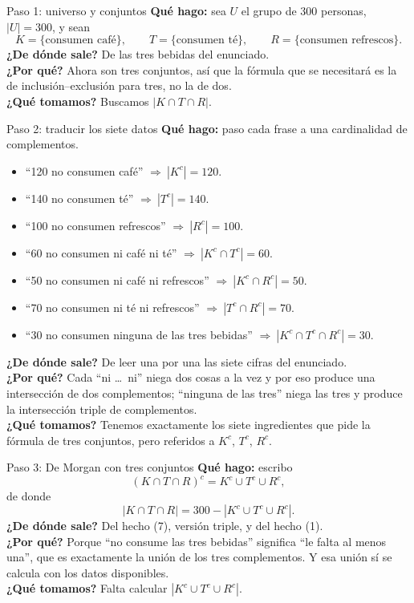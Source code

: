 \documentclass[11pt]{article}
\begin{document}
\begin{sol}

\begin{paso}{Paso 1: universo y conjuntos}
\textbf{Qu\'e hago:} sea $U$ el grupo de $300$ personas, $|U|=300$, y sean
\[
K=\{\text{consumen caf\'e}\},\qquad T=\{\text{consumen t\'e}\},\qquad R=\{\text{consumen refrescos}\}.
\]
\textbf{¿De d\'onde sale?} De las tres bebidas del enunciado.\\
\textbf{¿Por qu\'e?} Ahora son tres conjuntos, as\'i que la f\'ormula que se necesitar\'a es la de inclusi\'on--exclusi\'on para tres, no la de dos.\\
\textbf{¿Qu\'e tomamos?} Buscamos $|K\cap T\cap R|$.
\end{paso}

\begin{paso}{Paso 2: traducir los siete datos}
\textbf{Qu\'e hago:} paso cada frase a una cardinalidad de complementos.
\begin{itemize}[leftmargin=*]
  \item ``120 no consumen caf\'e'' $\Longrightarrow\ |K^{c}| = 120$.
  \item ``140 no consumen t\'e'' $\Longrightarrow\ |T^{c}| = 140$.
  \item ``100 no consumen refrescos'' $\Longrightarrow\ |R^{c}| = 100$.
  \item ``60 no consumen ni caf\'e ni t\'e'' $\Longrightarrow\ |K^{c}\cap T^{c}| = 60$.
  \item ``50 no consumen ni caf\'e ni refrescos'' $\Longrightarrow\ |K^{c}\cap R^{c}| = 50$.
  \item ``70 no consumen ni t\'e ni refrescos'' $\Longrightarrow\ |T^{c}\cap R^{c}| = 70$.
  \item ``30 no consumen ninguna de las tres bebidas'' $\Longrightarrow\ |K^{c}\cap T^{c}\cap R^{c}| = 30$.
\end{itemize}
\textbf{¿De d\'onde sale?} De leer una por una las siete cifras del enunciado.\\
\textbf{¿Por qu\'e?} Cada ``ni \dots\ ni'' niega dos cosas a la vez y por eso produce una intersecci\'on de dos complementos; ``ninguna de las tres'' niega las tres y produce la intersecci\'on triple de complementos.\\
\textbf{¿Qu\'e tomamos?} Tenemos exactamente los siete ingredientes que pide la f\'ormula de tres conjuntos, pero referidos a $K^{c}$, $T^{c}$, $R^{c}$.
\end{paso}

\begin{paso}{Paso 3: De Morgan con tres conjuntos}
\textbf{Qu\'e hago:} escribo
\[
(K\cap T\cap R)^{c} = K^{c}\cup T^{c}\cup R^{c},
\]
de donde
\[
|K\cap T\cap R| = 300 - |K^{c}\cup T^{c}\cup R^{c}| .
\]
\textbf{¿De d\'onde sale?} Del hecho (7), versi\'on triple, y del hecho (1).\\
\textbf{¿Por qu\'e?} Porque ``no consume las tres bebidas'' significa ``le falta al menos una'', que es exactamente la uni\'on de los tres complementos. Y esa uni\'on s\'i se calcula con los datos disponibles.\\
\textbf{¿Qu\'e tomamos?} Falta calcular $|K^{c}\cup T^{c}\cup R^{c}|$.
\end{paso}


\end{sol}
\end{document}
